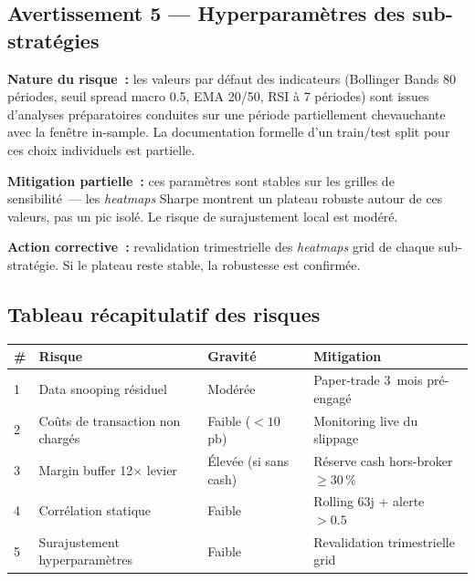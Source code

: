 \subsection{Avertissement 5 --- Hyperparamètres des sub-stratégies}

\begin{warningbox}
\textbf{Nature du risque~:} les valeurs par défaut des indicateurs (Bollinger Bands 80 périodes, seuil spread macro 0.5, EMA 20/50, RSI à 7 périodes) sont issues d'analyses préparatoires conduites sur une période partiellement chevauchante avec la fenêtre in-sample. La documentation formelle d'un train/test split pour ces choix individuels est partielle.

\textbf{Mitigation partielle~:} ces paramètres sont stables sur les grilles de sensibilité~--- les \emph{heatmaps} Sharpe montrent un plateau robuste autour de ces valeurs, pas un pic isolé. Le risque de surajustement local est modéré.

\textbf{Action corrective~:} revalidation trimestrielle des \emph{heatmaps} grid de chaque sub-stratégie. Si le plateau reste stable, la robustesse est confirmée.
\end{warningbox}

\subsection{Tableau récapitulatif des risques}

\begin{center}
\renewcommand{\arraystretch}{1.2}
\small
\begin{tabular}{lllp{4cm}}
\toprule
\textbf{\#} & \textbf{Risque} & \textbf{Gravité} & \textbf{Mitigation} \\
\midrule
1 & Data snooping résiduel & Modérée & Paper-trade 3~mois pré-engagé \\
2 & Coûts de transaction non chargés & Faible ($<10$\,pb) & Monitoring live du slippage \\
3 & Margin buffer 12$\times$ levier & Élevée (si sans cash) & Réserve cash hors-broker $\ge 30\,\%$ \\
4 & Corrélation statique & Faible & Rolling 63j + alerte $>0.5$ \\
5 & Surajustement hyperparamètres & Faible & Revalidation trimestrielle grid \\
\bottomrule
\end{tabular}
\end{center}
